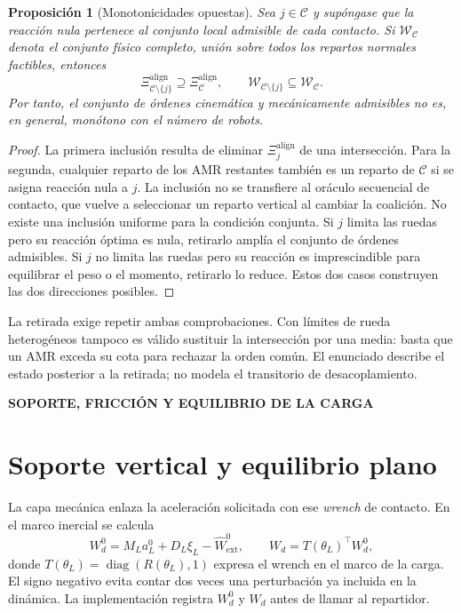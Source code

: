 \documentclass[12pt,a4paper]{article}
\newcommand{\leveltag}[1]{%
  \Needspace{5.5\baselineskip}%
  \noindent\colorbox{VIUDark}{%
    \parbox{\dimexpr\textwidth-2\fboxsep\relax}{%
      \color{white}\sffamily\bfseries\small #1%
    }%
  }\par\smallskip
}
\newtheorem{sp2prop}{Proposición}
\begin{document}
\begin{sp2prop}[Monotonicidades opuestas]
Sea $j\in\mathcal C$ y supóngase que la reacción nula pertenece al conjunto local
admisible de cada contacto. Si $\mathcal W_{\mathcal C}$ denota el conjunto
físico completo, unión sobre todos los repartos normales factibles, entonces
\begin{equation}
\Xi_{\mathcal C\setminus\{j\}}^{\mathrm{align}}
\supseteq\Xi_{\mathcal C}^{\mathrm{align}},
\qquad
\mathcal W_{\mathcal C\setminus\{j\}}\subseteq\mathcal W_{\mathcal C}.
\label{eq:opposite-monotonicity}
\end{equation}
Por tanto, el conjunto de órdenes cinemática y mecánicamente admisibles no es,
en general, monótono con el número de robots.
\end{sp2prop}
\begin{proof}
La primera inclusión resulta de eliminar $\Xi_j^{\mathrm{align}}$ de una
intersección. Para
la segunda, cualquier reparto de los AMR restantes también es un reparto de
$\mathcal C$ si se asigna reacción nula a $j$. La inclusión no se transfiere al
oráculo secuencial de contacto, que vuelve a seleccionar un reparto vertical al cambiar
la coalición. No existe una inclusión uniforme
para la condición conjunta. Si $j$ limita las ruedas pero su reacción óptima es
nula, retirarlo amplía el conjunto de órdenes admisibles. Si $j$ no limita las ruedas pero su
reacción es imprescindible para equilibrar el peso o el momento, retirarlo lo
reduce. Estos dos casos construyen las dos direcciones posibles.
\end{proof}

La retirada exige repetir ambas comprobaciones. Con límites de rueda
heterogéneos tampoco es válido sustituir la intersección por una media: basta que
un AMR exceda su cota para rechazar la orden común. El enunciado describe el
estado posterior a la retirada; no modela el transitorio de desacoplamiento.

\leveltag{SOPORTE, FRICCIÓN Y EQUILIBRIO DE LA CARGA}
\section*{Soporte vertical y equilibrio plano}

La capa mecánica enlaza la aceleración solicitada con ese \emph{wrench} de
contacto. En el marco inercial se calcula
\begin{equation}
W_d^0=M_La_L^0+D_L\xi_L-\widehat W_{\mathrm{ext}}^0,
\qquad
W_d=T(\theta_L)^\top W_d^0,
\label{eq:load-dynamics}
\end{equation}
donde $T(\theta_L)=\operatorname{diag}(R(\theta_L),1)$ expresa el wrench en el
marco de la carga. El signo negativo evita contar dos veces una perturbación ya
incluida en la dinámica. La implementación registra $W_d^0$ y $W_d$ antes de
llamar al repartidor.
\end{document}
